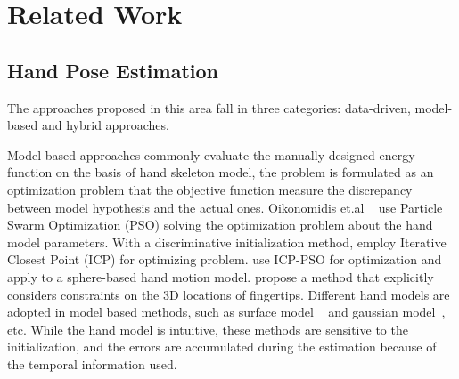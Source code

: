 \documentclass[journal,comsoc]{IEEEtran}
\begin{document}

\section{Related Work}\label{sec:related work}
\subsection{Hand Pose Estimation}
The approaches proposed in this area fall in three categories: data-driven, model-based and hybrid approaches.

Model-based approaches commonly evaluate the manually designed energy function on the basis of hand skeleton model,
the problem is formulated as an optimization problem that the objective function measure the discrepancy between
model hypothesis and the actual ones. Oikonomidis et.al ~\cite{oikonomidis2010markerless,oikonomidis2011efficient}
use Particle Swarm Optimization (PSO) solving the optimization problem about the hand model parameters.
With a discriminative initialization method, \cite{tagliasacchi2015robust} employ Iterative Closest Point (ICP)
for optimizing problem. \cite{qian2014realtime} use ICP-PSO for optimization and apply to a sphere-based hand motion model.
\cite{RoditakisMakrisArgyros2017} propose a method that explicitly considers constraints on the 3D locations of fingertips.
Different hand models are adopted in model based methods, such as surface model
~\cite{qian2014realtime,khamis2015learning} and gaussian model~\cite{sridhar2014real,tang2015opening},
etc. While the hand model is intuitive, these methods are sensitive to the initialization, and the errors are accumulated
during the estimation because of the temporal information used.
\end{document}

